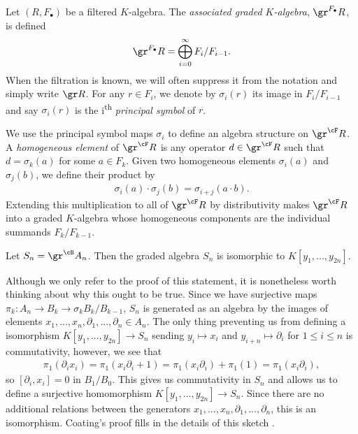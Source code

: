\begin{defn}\label{defn:assoc-graded}
	Let $(R, F_\bullet)$ be a filtered $K$-algebra. The \emph{associated graded $K$-algebra}, $\gr^{F_\bullet} R$, is defined
	\begin{align*}
		\gr^{F_\bullet} R = \bigoplus^{\infty}_{i=0} F_i/F_{i-1}.
	\end{align*}
	When the filtration is known, we will often suppress it from the notation and simply write $\gr R$. For any $r \in F_i$, we denote by $\sigma_i(r)$ its image in $F_i/F_{i-1}$ and say $\sigma_i(r)$ is the i\textsuperscript{th} \emph{principal symbol} of $r$.
\end{defn}
We use the principal symbol maps $\sigma_i$ to define an algebra structure on $\gr^\cF R$. A \emph{homogeneous element} of $\gr^\cF R$ is any operator $d \in \gr^\cF R$ such that $d = \sigma_k(a)$ for some $a \in F_k$. Given two homogeneous elements $\sigma_i(a)$ and $\sigma_j(b)$, we define their product by
\begin{align*}
	\sigma_i(a)\cdot \sigma_j(b) = \sigma_{i+j}(a\cdot b).
\end{align*}
Extending this multiplication to all of $\gr^\cF R$ by distributivity makes $\gr^\cF R$ into a graded $K$-algebra whose homogeneous components are the individual summands $F_k/F_{k-1}$.

\begin{comment}
\begin{rmk}\label{rmk:two-filtrations-yield-same-assoc-graded}
	Given that the notation $\gr A$ makes no reference to the choice of filtration, one would hope that $\gr A$ is independent of the specific filtration chosen, and indeed it is. 
\end{rmk}
\end{comment}

\begin{example}\label{example:graded-algebra-of-Weyl-algebra}
	Let $S_n = \gr^\cB A_n$. Then the graded algebra $S_n$ is isomorphic to $K[y_1,...,y_{2n}]$. 

	Although we only refer to the proof of this statement, it is nonetheless worth thinking about why this ought to be true. Since we have surjective maps $\pi_k:A_n\to B_k \to{\sigma_k} B_k/B_{k-1}$, $S_n$ is generated as an algebra by the images of elements $x_1,...,x_n,\partial_1,...,\partial_n \in A_n$. The only thing preventing us from defining a isomorphism $K[y_1,...,y_{2n}]\to S_n$ sending $y_i\mapsto x_i$ and $y_{i+n}\mapsto \partial_{i}$ for $1\leq i\leq n$ is commutativity, however, we see that
	\begin{align*}
		\pi_1(\partial_i x_i) = \pi_1(x_i\partial_i + 1) = \pi_1(x_i\partial_i) + \pi_1(1) = \pi_1(x_i\partial_i),
	\end{align*}
	so $[\partial_i,x_i] = 0$ in $B_1/B_0$. This gives us commutativity in $S_n$ and allows us to define a surjective homomorphism $K[y_1,...,y_{2n}] \to S_n$. Since there are no additional relations between the generators $x_1,...,x_n,\partial_1,...,\partial_n$, this is an isomorphism. Coating's proof fills in the details of this sketch \cite[pg. 58]{d-mod-primer}.
\end{example}

